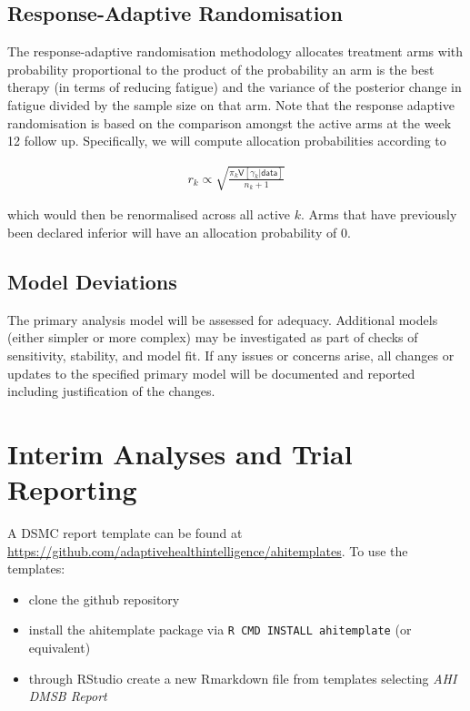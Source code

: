 \documentclass[
]{article}
\begin{document}
\hypertarget{response-adaptive-randomisation}{%
\subsection{Response-Adaptive Randomisation}\label{response-adaptive-randomisation}}

The response-adaptive randomisation methodology allocates treatment arms with probability proportional to the product of the probability an arm is the best therapy (in terms of reducing fatigue) and the variance of the posterior change in fatigue divided by the sample size on that arm.
Note that the response adaptive randomisation is based on the comparison amongst the active arms at the week 12 follow up.
Specifically, we will compute allocation probabilities according to

\[
\begin{aligned}
r_{k} \propto \sqrt{ \frac{\pi_k \mathsf{V}[\gamma_k | \mathsf{data} ]}{ n_k + 1}  }
\end{aligned}
\]

which would then be renormalised across all active $k$.
Arms that have previously been declared inferior will have an allocation probability of $0$.


\hypertarget{model-deviations}{%
\subsection{Model Deviations}\label{model-deviations}}

The primary analysis model will be assessed for adequacy.
Additional models (either simpler or more complex) may be investigated as part of checks of sensitivity, stability, and model fit.
If any issues or concerns arise, all changes or updates to the specified primary model will be documented and reported including justification of the changes.

\clearpage

\hypertarget{interim-analyses-and-trial-reporting}{%
\section{Interim Analyses and Trial Reporting}\label{interim-analyses-and-trial-reporting}}

A DSMC report template can be found at \url{https://github.com/adaptivehealthintelligence/ahitemplates}.
To use the templates:

\begin{itemize}
\item clone the github repository
\item install the ahitemplate package via \texttt{R CMD INSTALL ahitemplate} (or equivalent)
\item through RStudio create a new Rmarkdown file from templates selecting \textit{AHI DMSB Report}
\end{itemize}
\end{document}
